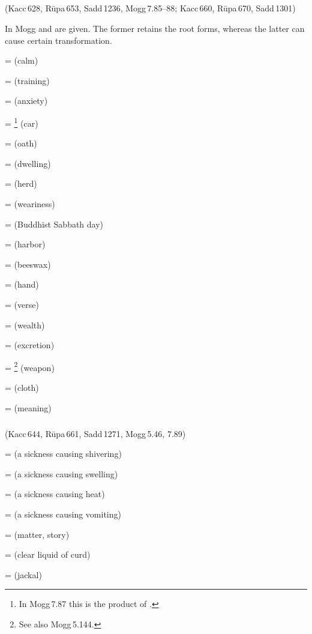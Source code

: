 \subparagraph*{} (Kacc\,628, R\=upa\,653, Sadd\,1236, Mogg\,7.85--88; Kacc\,660, R\=upa\,670, Sadd\,1301)\label{pacckx:tha}\label{pacckx:atha}\label{pacckx:thaka}

In Mogg  and  are given. The former retains the root forms, whereas the latter can cause certain transformation.

 =  (calm)\par
{} =  (training)\par
{} =  (anxiety)\par
{} = \footnote{In Mogg\,7.87 this is the product of .} (car)\par
{} =  (oath)\par
{} =  (dwelling)\par
{} =  (herd)\par
{} =  (weariness)\par
{} =  (Buddhist Sabbath day)\par
{} =  (harbor)\par
{} =  (beeswax)\par
{} =  (hand)\par
{} =  (verse)\par
{} =  (wealth)\par
{} =  (excretion)\par
{} = \footnote{See also Mogg\,5.144.} (weapon)\par
{} =  (cloth)\par
{} =  (meaning)\par

\subparagraph*{} (Kacc\,644, R\=upa\,661, Sadd\,1271, Mogg\,5.46, 7.89)\label{pacckx:thu}\label{pacckx:athu}

 =  (a sickness causing shivering)\par
{} =  (a sickness causing swelling)\par
{} =  (a sickness causing heat)\par
{} =  (a sickness causing vomiting)\par
{} =  (matter, story)\par
{} =  (clear liquid of curd)\par
{} =  (jackal)\par

